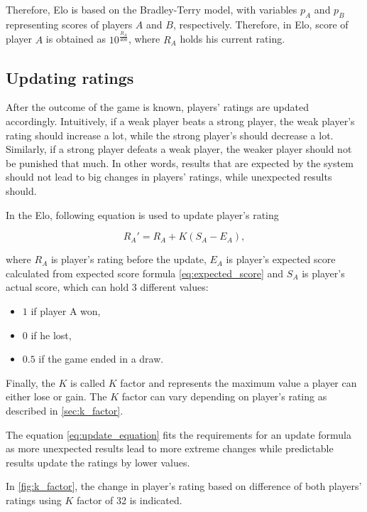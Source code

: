 Therefore, Elo is based on the Bradley-Terry model, with variables $p_A$ and $p_B$ representing scores of players $A$ and $B$, respectively. Therefore, in Elo, score of player $A$ is obtained as $10^\frac{R_A}{400}$, where $R_A$ holds his current rating.

\subsection{Updating ratings}
After the outcome of the game is known, players' ratings are updated accordingly. Intuitively, if a weak player beats a strong player, the weak player's rating should increase a lot, while the strong player's should decrease a lot. Similarly, if a strong player defeats a weak player, the weaker player should not be punished that much. In other words, results that are expected by the system should not lead to big changes in players' ratings, while unexpected results should.

In the Elo, following equation is used to update player's rating

\begin{equation}
R_A' = R_A + K(S_A - E_A),
\label{eq:update_equation}
\end{equation}

\noindent where $R_A$ is player's rating before the update, $E_A$ is player's expected score calculated from expected score formula \eqref{eq:expected_score} and $S_A$ is player's actual score, which can hold 3 different values:

\begin{itemize}
\item $1$ if player A won, 
\item $0$ if he lost,
\item $0.5$ if the game ended in a draw.
\end{itemize}

Finally, the $K$ is called $K$ factor and represents the maximum value a player can either lose or gain. The $K$ factor can vary depending on player's rating as described in \eqref{sec:k_factor}.

The equation \eqref{eq:update_equation} fits the requirements for an update formula as more unexpected results lead to more extreme changes while predictable results update the ratings by lower values.

In \autoref{fig:k_factor}, the change in player's rating based on difference of both players' ratings using $K$ factor of 32 is indicated.

